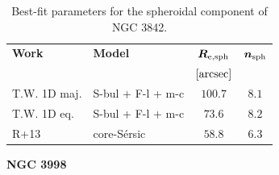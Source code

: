\documentclass[preprint2]{emulateapj}
\begin{document}
  \begin{table}[h]
  \small
  \caption{Best-fit parameters for the spheroidal component of NGC 3842.}
  \begin{center}
  \begin{tabular}{llcc}
  \hline
  {\bf Work} & {\bf Model}   & $\bm R_{\rm e,sph}$    & $\bm n_{\rm sph}$ \\
    &  &  $[\rm arcsec]$ & \\
  \hline
  T.W. 1D maj. & S-bul + F-l + m-c  & $100.7$  &  $8.1$ \\
  T.W. 1D eq.  & S-bul + F-l + m-c  & $73.6$   &  $8.2$ \\
  \hline
  R+13         & core-S\'ersic & $58.8$  &  $6.3$ \\
  \hline
  \end{tabular}
  \end{center}
  \label{tab:n3842}
  \end{table}  


  \clearpage\newpage\noindent
  {\bf NGC 3998 \\}
\end{document}
